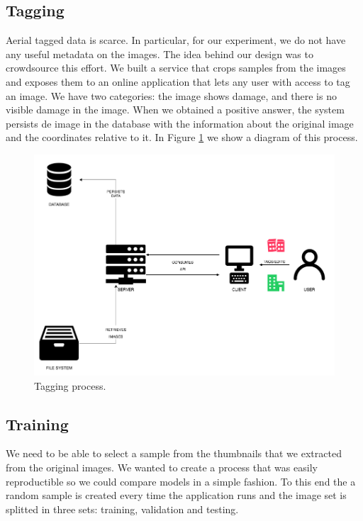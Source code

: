 \subsection{Tagging}

Aerial tagged data is scarce. In particular, for our experiment, we do not have any useful metadata on the images. The idea behind our design was to crowdsource this effort. We built a service that crops samples from the images and exposes them to an online application that lets any user with access to tag an image. We have two categories: the image shows damage, and there is no visible damage in the image. When we obtained a positive answer, the system persists de image in the database with the information about the original image and the coordinates relative to it. In Figure \ref{fig:tag} we show a diagram of this process.\\


\begin{figure}[!h]
  \centering
  \includegraphics[width=1\textwidth]{images/tag-diagram.png}
  \caption{Tagging process.}
  \label{fig:tag}
\end{figure}


\subsection{Training}

We need to be able to select a sample from the thumbnails that we extracted from the original images. We wanted to create a process that was easily reproductible so we could compare models in a simple fashion. To this end the a random sample is created every time the application runs and the image set is splitted in three sets: training, validation and testing.\\

